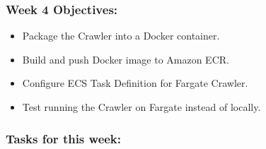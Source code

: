 \hypertarget{week-4-objectives}{%
\subsubsection{Week 4 Objectives:}}

\begin{itemize}
\tightlist
\item
  Package the Crawler into a Docker container.
\item
  Build and push Docker image to Amazon ECR.
\item
  Configure ECS Task Definition for Fargate Crawler.
\item
  Test running the Crawler on Fargate instead of locally.
\end{itemize}

\hypertarget{tasks-for-this-week}{%
\subsubsection{Tasks for this week:}}

